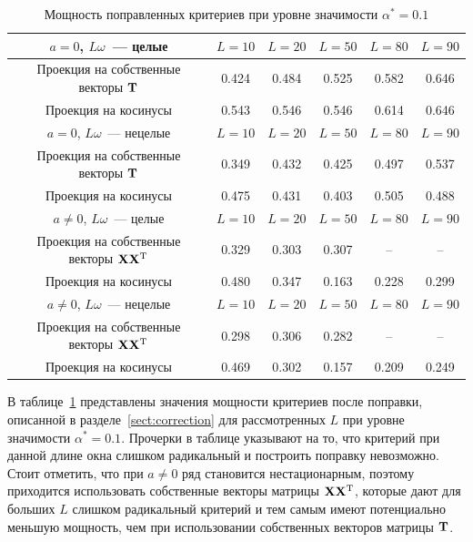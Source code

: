 \documentclass[specialist,
substylefile = spbu_report.rtx,
subf,12pt]{disser}
\theoremstyle{definition}
\begin{document}
\begin{table}[h!]
	\centering
	\caption{Мощность поправленных критериев при уровне значимости $\alpha^*=0.1$}
	\label{tab:mcssa_comp_power}
	\begin{tabular}{c|c|c|c|c|c}
		$a=0$, $L\omega$~--- целые                      & $L=10$ & $L=20$ & $L=50$ & $L=80$ & $L=90$ \\
		\hline
		Проекция на собственные векторы $\mathbf{T}$          & 0.424  & 0.484  & 0.525  & 0.582  & 0.646  \\
		\hline
		Проекция на косинусы                            & 0.543  & 0.546  & 0.546  & 0.614  & 0.646  \\
		\hhline{======}
		$a=0$, $L\omega$~--- нецелые                    & $L=10$ & $L=20$ & $L=50$ & $L=80$ & $L=90$ \\
		\hline
		Проекция на собственные векторы $\mathbf{T}$          & 0.349  & 0.432  & 0.425  & 0.497  & 0.537  \\
		\hline
		Проекция на косинусы                            & 0.475  & 0.431  & 0.403  & 0.505  & 0.488  \\
		\hhline{======}
		$a\ne0$, $L\omega$~--- целые                    & $L=10$ & $L=20$ & $L=50$ & $L=80$ & $L=90$ \\
		\hline
		Проекция на собственные векторы $\mathbf{X}\mathbf{X}^{\mathrm{T}}$ & 0.329  & 0.303  & 0.307  & --     & --     \\
		\hline
		Проекция на косинусы                            & 0.480  & 0.347  & 0.163  & 0.228  & 0.299  \\
		\hhline{======}
		$a\ne0$, $L\omega$~--- нецелые                  & $L=10$ & $L=20$ & $L=50$ & $L=80$ & $L=90$ \\
		\hline
		Проекция на собственные векторы $\mathbf{X}\mathbf{X}^{\mathrm{T}}$ & 0.298  & 0.306  & 0.282  & --     & --     \\
		\hline
		Проекция на косинусы                            & 0.469  & 0.302  & 0.157  & 0.209  & 0.249  \\
	\end{tabular}
\end{table}

В таблице~\ref{tab:mcssa_comp_power} представлены значения мощности критериев после поправки, описанной в разделе~\ref{sect:correction} для рассмотренных $L$ при уровне значимости $\alpha^*=0.1$. Прочерки в таблице указывают на то, что критерий при данной длине окна слишком радикальный и построить поправку невозможно. Стоит отметить, что при $a\ne0$ ряд становится нестационарным, поэтому приходится использовать собственные векторы матрицы $\mathbf{X}\mathbf{X}^{\mathrm{T}}$, которые дают для больших $L$ слишком радикальный критерий и тем самым имеют потенциально меньшую мощность, чем при использовании собственных векторов матрицы $\mathbf{T}$.
\end{document}
